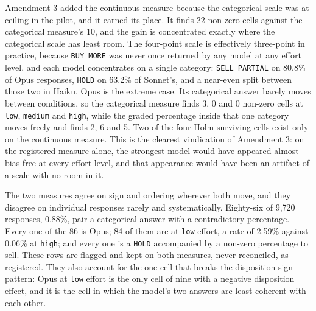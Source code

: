 \label{sec:pctmeasure}\label{app:pctmeasure}
Amendment 3 added the continuous measure because the categorical scale was at
ceiling in the pilot, and it earned its place. It finds 22 non-zero cells
against the categorical measure's 10, and the gain is concentrated exactly
where the categorical scale has least room. The four-point scale is
effectively three-point in practice, because \texttt{BUY\_MORE} was never
once returned by any model at any effort level, and each model concentrates
on a single category: \texttt{SELL\_PARTIAL} on 80.8\% of Opus responses,
\texttt{HOLD} on 63.2\% of Sonnet's, and a near-even split between those two
in Haiku. Opus is the extreme case. Its categorical answer barely moves
between conditions, so the categorical measure finds 3, 0 and 0 non-zero
cells at \texttt{low}, \texttt{medium} and \texttt{high}, while the graded
percentage inside that one category moves freely and finds 2, 6 and 5. Two of
the four Holm surviving cells exist only on the continuous measure. This is
the clearest vindication of Amendment 3: on the registered measure alone,
the strongest model would have appeared almost bias-free at every effort
level, and that appearance would have been an artifact of a scale with no
room in it.

The two measures agree on sign and ordering wherever both move, and they
disagree on individual responses rarely and systematically. Eighty-six of
9{,}720 responses, 0.88\%, pair a categorical answer with a contradictory
percentage. Every one of the 86 is Opus; 84 of them are at \texttt{low}
effort, a rate of 2.59\% against 0.06\% at \texttt{high}; and every one is a
\texttt{HOLD} accompanied by a non-zero percentage to sell. These rows are
flagged and kept on both measures, never reconciled, as registered. They also
account for the one cell that breaks the disposition sign pattern: Opus at
\texttt{low} effort is the only cell of nine with a negative disposition
effect, and it is the cell in which the model's two answers are least
coherent with each other.
